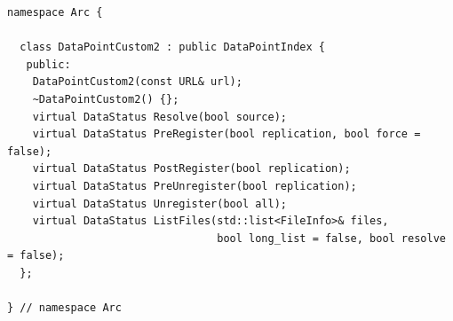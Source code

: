 \documentclass{book}
\begin{document}
\begin{verbatim}
namespace Arc {

  class DataPointCustom2 : public DataPointIndex {
   public:
    DataPointCustom2(const URL& url);
    ~DataPointCustom2() {};
    virtual DataStatus Resolve(bool source);
    virtual DataStatus PreRegister(bool replication, bool force = false);
    virtual DataStatus PostRegister(bool replication);
    virtual DataStatus PreUnregister(bool replication);
    virtual DataStatus Unregister(bool all);
    virtual DataStatus ListFiles(std::list<FileInfo>& files,
                                 bool long_list = false, bool resolve = false);
  };

} // namespace Arc
\end{verbatim}

%
\end{document}
